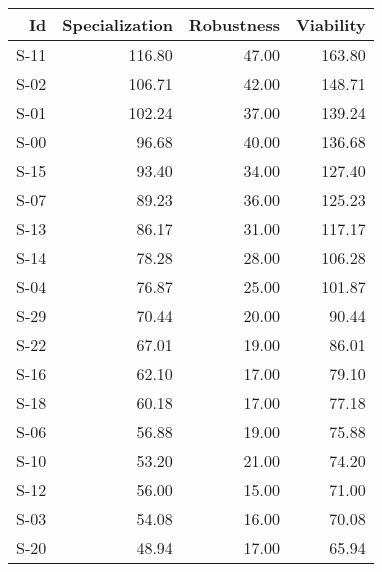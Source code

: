 \begin{tabular}{ | r | r | r | r | }
    \hline
                    Id  &  Specialization  &      Robustness  &       Viability  \\
    \hline
    \hline
                  S-11  &          116.80  &           47.00  &          163.80  \\
    \hline
                  S-02  &          106.71  &           42.00  &          148.71  \\
    \hline
                  S-01  &          102.24  &           37.00  &          139.24  \\
    \hline
                  S-00  &           96.68  &           40.00  &          136.68  \\
    \hline
                  S-15  &           93.40  &           34.00  &          127.40  \\
    \hline
                  S-07  &           89.23  &           36.00  &          125.23  \\
    \hline
                  S-13  &           86.17  &           31.00  &          117.17  \\
    \hline
                  S-14  &           78.28  &           28.00  &          106.28  \\
    \hline
                  S-04  &           76.87  &           25.00  &          101.87  \\
    \hline
                  S-29  &           70.44  &           20.00  &           90.44  \\
    \hline
                  S-22  &           67.01  &           19.00  &           86.01  \\
    \hline
                  S-16  &           62.10  &           17.00  &           79.10  \\
    \hline
                  S-18  &           60.18  &           17.00  &           77.18  \\
    \hline
                  S-06  &           56.88  &           19.00  &           75.88  \\
    \hline
                  S-10  &           53.20  &           21.00  &           74.20  \\
    \hline
                  S-12  &           56.00  &           15.00  &           71.00  \\
    \hline
                  S-03  &           54.08  &           16.00  &           70.08  \\
    \hline
                  S-20  &           48.94  &           17.00  &           65.94  \\

\end{tabular}
